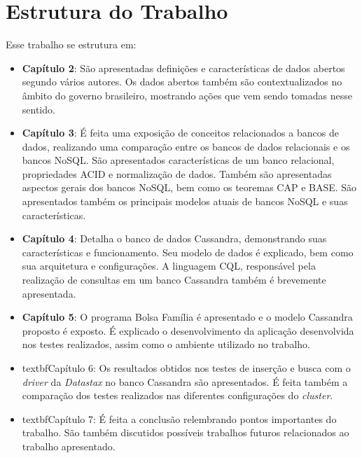 \section{Estrutura do Trabalho}
Esse trabalho se estrutura em:
\begin{itemize}
\item \textbf{Capítulo 2}: São apresentadas definições e características de dados abertos segundo vários autores. Os dados abertos também são contextualizados no âmbito do governo brasileiro, mostrando ações que vem sendo tomadas nesse sentido.
\item \textbf{Capítulo 3}: É feita uma exposição de conceitos relacionados a bancos de dados, realizando uma comparação entre os bancos de dados relacionais e os bancos NoSQL. São apresentados características de um banco relacional, propriedades ACID e normalização de dados. Também são apresentadas aspectos gerais dos bancos NoSQL, bem como os teoremas CAP e BASE. São apresentados também os principais modelos atuais de bancos NoSQL e suas características.
\item \textbf{Capítulo 4}: Detalha o banco de dados Cassandra, demonstrando suas características e funcionamento. Seu modelo de dados é explicado, bem como sua arquitetura e configurações. A linguagem CQL, responsável pela realização de consultas em um banco Cassandra também é brevemente apresentada.
\item \textbf{Capítulo 5}: O programa Bolsa Família é apresentado e o modelo Cassandra proposto é exposto. É explicado o desenvolvimento da aplicação desenvolvida nos testes realizados, assim como o ambiente utilizado no trabalho.
\item textbf{Capítulo 6}: Os resultados obtidos nos testes de inserção e busca com o \emph{driver} da \emph{Datastax} no banco Cassandra são apresentados. É feita também a comparação dos testes realizados nas diferentes configurações do \emph{cluster}.
\item textbf{Capítulo 7}: É feita a conclusão relembrando pontos importantes do trabalho. São também discutidos possíveis trabalhos futuros relacionados ao trabalho apresentado.
\end{itemize}





